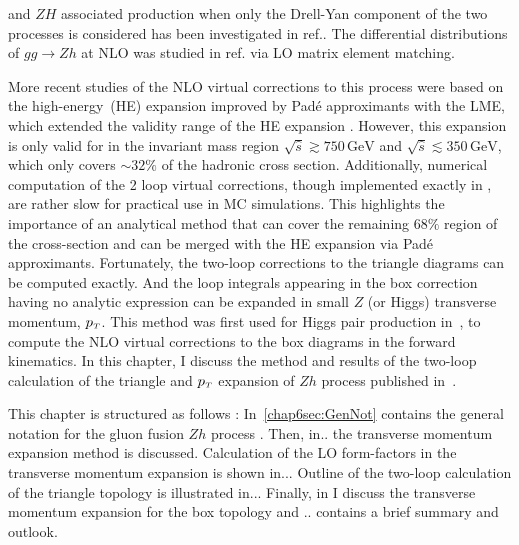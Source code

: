 and $ Z H$ associated production when only the Drell-Yan component of the two processes is considered has been investigated in ref.\cite{Harlander:2018yns}. The differential distributions of $g g \rightarrow Zh$  at NLO was studied in ref.\cite{Hespel:2015zea} via LO matrix element matching. 
\par More recent studies of the NLO virtual corrections to this process were based on the high-energy~(HE) expansion improved by Pad\'e approximants with the LME, which extended the validity range of the HE expansion \cite{Davies:2020drs}. However, this expansion is only valid for in the invariant mass region $\sqrt{\hat{s}}  \gtrsim 750\, \si{\GeV} $ and $\sqrt{\hat{s}}  \lesssim 350\,  \si{\GeV}$,  which only covers $\sim 32\%$ of the hadronic cross section. Additionally, numerical computation of the 2 loop virtual corrections, though implemented exactly in  \cite{Chen:2020gae}, are rather slow for practical use in MC simulations.  This highlights the importance of an analytical method that can cover the remaining $68\%$ region of the cross-section and can be merged with the HE expansion via Pad\'e approximants. Fortunately, the two-loop corrections to the triangle diagrams can be computed exactly. And the loop integrals appearing in the box correction having no analytic expression can be expanded in small  $Z$ (or Higgs) 
transverse momentum, $p_{\scriptscriptstyle T}$. This method was first used for Higgs pair production in~\cite{Bonciani:2018omm}, to compute the NLO virtual corrections to the box diagrams in the forward kinematics.  In this chapter, I discuss the method and results of the two-loop calculation of the triangle and $p_{\scriptscriptstyle T}$ expansion of $Zh$ process published in~\cite{Alasfar:2021ppe}. 
\par This chapter is structured as follows : In~\autoref{chap6sec:GenNot} contains the general notation for the gluon fusion $Zh$ process . Then, in.. the transverse momentum expansion method is discussed.  Calculation of the LO form-factors in the transverse momentum expansion is shown in... Outline of the two-loop calculation of the triangle topology is illustrated in... Finally, in  I discuss the transverse momentum expansion for the box topology and  .. contains a brief summary and outlook. 

